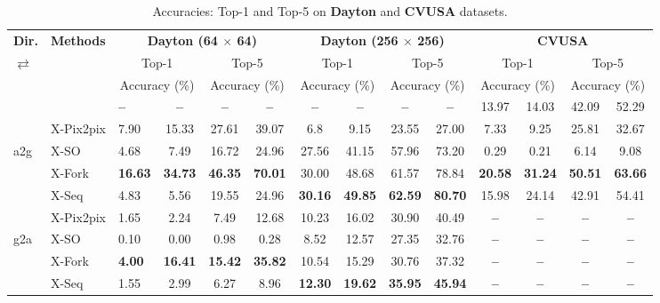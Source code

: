 \documentclass[times,twocolumn,final,authoryear]{elsarticle_modified}
\begin{document}
\begin{table*}[t]
\small
  \renewcommand{\arraystretch}{.7}
  \centering
  \caption{\small Accuracies: Top-1 and Top-5 on {\bf Dayton} and {\bf CVUSA} datasets.}
  \vspace{-10pt}
  \label{tab:accuracies}
    \begin{tabular*}{\textwidth}{l @{\extracolsep{\fill}} llccccccccccc}
        \toprule
               \multicolumn{1}{l}{\textbf{Dir.}} & \multicolumn{1}{l}{\textbf{Methods}} & \multicolumn{4}{c}{\textbf{Dayton (64 $\times$ 64)}} & \multicolumn{4}{c}{\textbf{Dayton (256 $\times$ 256)}} & \multicolumn{4}{c}{\textbf{CVUSA}}     \\
                \cmidrule(lr){3-6}
\cmidrule(lr){7-10} \cmidrule(lr){11-14}
     $\rightleftarrows$   &  & \multicolumn{2}{c}{Top-1} & \multicolumn{2}{c}{Top-5} & \multicolumn{2}{c}{Top-1} & \multicolumn{2}{c}{Top-5} & \multicolumn{2}{c}{Top-1} & \multicolumn{2}{c}{Top-5} \\
        &  & \multicolumn{2}{c}{Accuracy (\%)} & \multicolumn{2}{c}{Accuracy (\%)} & \multicolumn{2}{c}{Accuracy (\%)} & \multicolumn{2}{c}{Accuracy (\%)} & \multicolumn{2}{c}{Accuracy (\%)} & \multicolumn{2}{c}{Accuracy (\%)} \\
          \midrule
      &   \cite{zhai2017crossview} & \textbf{--} & \textbf{--} & \textbf{--} & \textbf{--} & \textbf{--} & \textbf{--} & \textbf{--} & \textbf{--} & 13.97 & 14.03 & 42.09 & 52.29 \\
      &  X-Pix2pix  & 7.90 & 15.33 & 27.61 & 39.07 & 6.8 & 9.15 & 23.55 & 27.00 & 7.33 & 9.25 & 25.81 & 32.67 \\
a2g  &  X-SO & 4.68 & 7.49 & 16.72 & 24.96 & 27.56 & 41.15 & 57.96 & 73.20 & 0.29 & 0.21 & 6.14 & 9.08 \\
  &  X-Fork & \textbf{16.63} & \textbf{34.73} & \textbf{46.35} & \textbf{70.01} & 30.00 & 48.68 & 61.57 & 78.84 & \textbf{20.58} & \textbf{31.24} & \textbf{50.51} & \textbf{63.66}\\
  &  X-Seq & 4.83 & 5.56 & 19.55 & 24.96 & \textbf{30.16} & \textbf{49.85} & \textbf{62.59} & \textbf{80.70} & 15.98 & 24.14 & 42.91 & 54.41 \\
    \midrule
    &    X-Pix2pix  & 1.65 & 2.24 & 7.49 & 12.68 & 10.23 & 16.02 & 30.90 & 40.49 & \textbf{--} & \textbf{--} & \textbf{--} & \textbf{--} \\
    g2a  &  X-SO & 0.10 & 0.00 &  0.98 & 0.28 & 8.52 & 12.57 & 27.35 & 32.76 &\textbf{--} & \textbf{--} & \textbf{--} & \textbf{--}\\
 & X-Fork & \textbf{4.00} & \textbf{16.41} & \textbf{15.42} & \textbf{35.82} & 10.54 & 15.29 & 30.76 & 37.32 & \textbf{--} & \textbf{--} & \textbf{--} & \textbf{--}\\
  &  X-Seq & 1.55 & 2.99 & 6.27 & 8.96 & \textbf{12.30} & \textbf{19.62} & \textbf{35.95} & \textbf{45.94} & \textbf{--} & \textbf{--} & \textbf{--} & \textbf{--} \\
        \bottomrule
\end{tabular*}
      \vspace{-10pt}
\end{table*}
\end{document}
